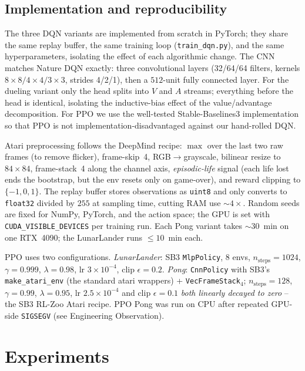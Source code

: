 \documentclass[12pt]{article}
\begin{document}
\subsection{Implementation and reproducibility}

The three DQN variants are implemented from scratch in PyTorch;
they share the same replay buffer, the same
training loop (\texttt{train\_dqn.py}), and the same hyperparameters,
isolating the effect of each algorithmic change. The CNN matches Nature
DQN exactly: three convolutional layers (32/64/64 filters, kernels
$8{\times}8/4{\times}4/3{\times}3$, strides 4/2/1), then a $512$-unit
fully connected layer. For the dueling variant only the head splits into
$V$ and $A$ streams; everything before the head is identical, isolating
the inductive-bias effect of the value/advantage decomposition. For PPO
we use the well-tested Stable-Baselines3 implementation
\citep{raffin2021stable} so that PPO is not implementation-disadvantaged
against our hand-rolled DQN.

Atari preprocessing follows the DeepMind recipe: $\max$ over the
last two raw frames (to remove flicker), frame-skip~4, RGB$\to$grayscale,
bilinear resize to $84{\times}84$, frame-stack~4 along the channel axis,
\emph{episodic-life} signal (each life lost ends the bootstrap, but the env
resets only on game-over), and reward clipping to $\{-1,0,1\}$. The replay
buffer stores observations as \texttt{uint8} and only converts to
\texttt{float32} divided by $255$ at sampling time, cutting RAM use $\sim 4\times$.
Random seeds are fixed for NumPy, PyTorch, and the action space; the GPU
is set with \texttt{CUDA\_VISIBLE\_DEVICES} per training run. Each Pong
variant takes $\sim 30$~min on one RTX~4090; the LunarLander runs $\leq 10$~min each.

PPO uses two configurations. \emph{LunarLander}: SB3 \texttt{MlpPolicy},
$8$ envs, $n_{\text{steps}}\!=\!1024$, $\gamma\!=\!0.999$,
$\lambda\!=\!0.98$, lr $3\!\times\!10^{-4}$, clip $\epsilon\!=\!0.2$.
\emph{Pong}: \texttt{CnnPolicy} with SB3's \texttt{make\_atari\_env}
(the standard atari wrappers) + \texttt{VecFrameStack$_{4}$};
$n_{\text{steps}}\!=\!128$, $\gamma\!=\!0.99$, $\lambda\!=\!0.95$, lr
$2.5\!\times\!10^{-4}$ and clip $\epsilon\!=\!0.1$ \emph{both linearly
decayed to zero} -- the SB3 RL-Zoo Atari recipe. PPO Pong was run on CPU
after repeated GPU-side \texttt{SIGSEGV} (see Engineering Observation).

\section{Experiments}
\end{document}
